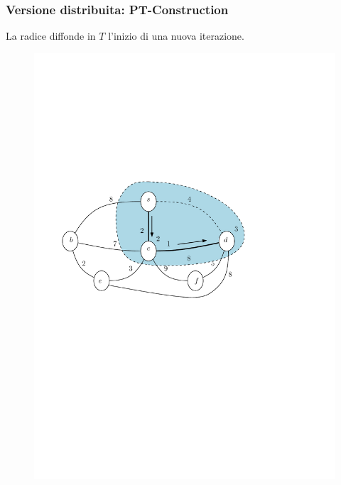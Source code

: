 \documentclass[10pt,xcolor=dvipsnames]{beamer}
\begin{document}
\begin{frame}
	\frametitle{Versione distribuita: PT-Construction}
	La radice diffonde in $T$ l'inizio di una nuova iterazione.
	\begin{figure}[h]
	\centering
		\includegraphics[scale=0.6]{PT1.pdf}
	\end{figure}
\end{frame}
\end{document}
